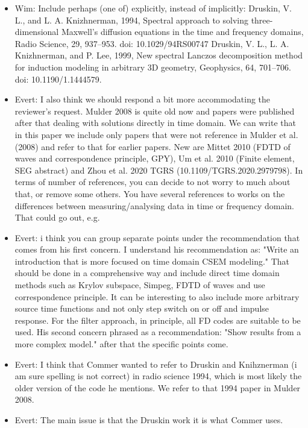 \documentclass[extra, camera,%
    referee,     %
]{gji}
\begin{document}
{\begin{itemize}
  \item Wim: Include perhaps (one of) explicitly, instead of implicitly:
    Druskin, V. L., and L. A. Knizhnerman, 1994, Spectral approach to solving
    three-dimensional Maxwell’s diffusion equations in the time and frequency
    domains, Radio Science, 29, 937--953. doi: 10.1029/94RS00747 Druskin, V.
    L., L. A. Knizhnerman, and P. Lee, 1999, New spectral Lanczos decomposition
    method for induction modeling in arbitrary 3D geometry, Geophysics, 64,
    701--706. doi: 10.1190/1.1444579.
  \item Evert: I also think we should respond a bit more accommodating the
    reviewer's request. Mulder 2008 is quite old now and papers were published
    after that dealing with solutions directly in time domain. We can write
    that in this paper we include only papers that were not reference in Mulder
    et al. (2008) and refer to that for earlier papers. New are Mittet 2010
    (FDTD of waves and correspondence principle, GPY), Um et al. 2010 (Finite
    element, SEG abstract) and Zhou et al. 2020 TGRS
    (10.1109/TGRS.2020.2979798). In terms of number of references, you can
    decide to not worry to much about that, or remove some others. You have
    several references to works on the differences between measuring/analysing
    data in time or frequency domain. That could go out, e.g.
  \item Evert: i think you can group separate points under the recommendation
    that comes from his first concern. I understand his recommendation as:
    "Write an introduction that is more focused on time domain CSEM modeling."
    That should be done in a comprehensive way and include direct time domain
    methods such as Krylov subspace, Simpeg, FDTD of waves and use
    correspondence principle. It can be interesting to also include more
    arbitrary source time functions and not only step switch on or off and
    impulse response. For the filter approach, in principle, all FD codes are
    suitable to be used. His second concern phrased as a recommendation: "Show
    results from a more complex model." after that the specific points come.
  \item Evert: I think that Commer wanted to refer to Druskin and Knihznerman
    (i am sure spelling is not correct) in radio science 1994, which is most
    likely the older version of the code he mentions. We refer to that 1994
    paper in Mulder 2008.
  \item Evert: The main issue is that the Druskin work it is what Commer uses.

\end{itemize}}
\end{document}
